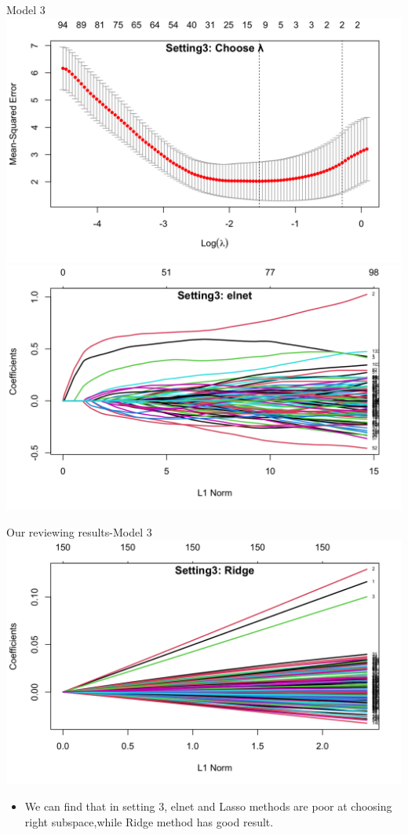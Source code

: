\documentclass{beamer}
\begin{document}
\begin{frame}{Model 3}
    \centering \includegraphics[scale=0.13]{3.1.png}
     \includegraphics[scale=0.13]{3.4.png}
\end{frame}
\begin{frame}{Our reviewing results-Model 3}
    \centering \includegraphics[scale=0.15]{3.2.png}
    \begin{itemize}
        \item We can find that in setting 3, elnet and Lasso methods are poor at choosing right subspace,while Ridge method has good result.
    \end{itemize}
\end{frame}
\end{document}
